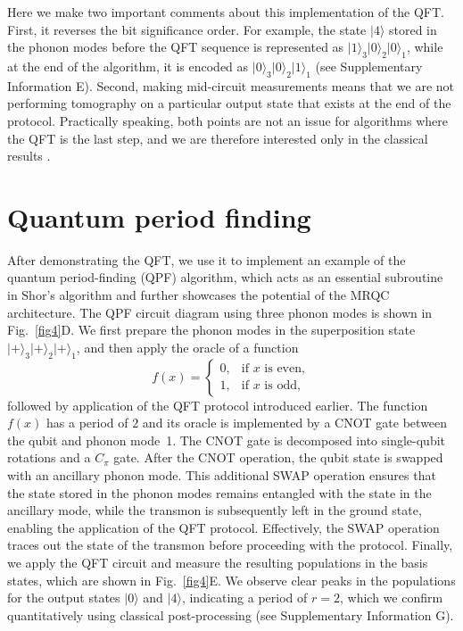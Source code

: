 \documentclass[12pt]{article}
\newcommand{\ket}[1]{\ensuremath{|{#1}\rangle}}
\begin{document}
Here we make two important comments about this implementation of the QFT. First, it reverses the bit significance order. For example, the state $\ket{4}$ stored in the phonon modes before the QFT sequence is represented as $\ket{1}_3\ket{0}_2\ket{0}_1$, while at the end of the algorithm, it is encoded as $\ket{0}_3\ket{0}_2\ket{1}_1$ (see Supplementary Information E). Second, making mid-circuit measurements means that we are not performing tomography on a particular output state that exists at the end of the protocol. Practically speaking, both points are not an issue for algorithms where the QFT is the last step, and we are therefore interested only in the classical results \cite{griffiths1996semiclassical, chiaverini2005implementation}.

\section*{Quantum period finding}
After demonstrating the QFT, we use it to implement an example of the quantum period-finding (QPF) algorithm, which acts as an essential subroutine in Shor's algorithm\cite{shor1999polynomial} and further showcases the potential of the MRQC architecture. The QPF circuit diagram using three phonon modes is shown in Fig.~\ref{fig4}D. We first prepare the phonon modes in the superposition state $\ket{+}_3\ket{+}_2\ket{+}_1$, and then apply the oracle of a function
\[
f(x) =
\begin{cases}
0, & \text{if $x$ is even}, \\
1, & \text{if $x$ is odd},
\end{cases}
\]
followed by application of the QFT protocol introduced earlier.  The function $f(x)$ has a period of $2$ and its oracle is implemented by a CNOT gate between the qubit and phonon mode~1. The CNOT gate is decomposed into single-qubit rotations and a $C_{\pi}$ gate. After the CNOT operation, the qubit state is swapped with an ancillary phonon mode. This additional SWAP operation ensures that the state stored in the phonon modes remains entangled with the state in the ancillary mode, while the transmon is subsequently left in the ground state, enabling the application of the QFT protocol. Effectively, the SWAP operation traces out the state of the transmon before proceeding with the protocol. Finally, we apply the QFT circuit and measure the resulting populations in the basis states, which are shown in Fig.~\ref{fig4}E. We observe clear peaks in the populations for the output states $\ket{0}$ and $\ket{4}$, indicating a period of $r = 2$, which we confirm quantitatively using classical post-processing (see Supplementary Information G).
\end{document}

